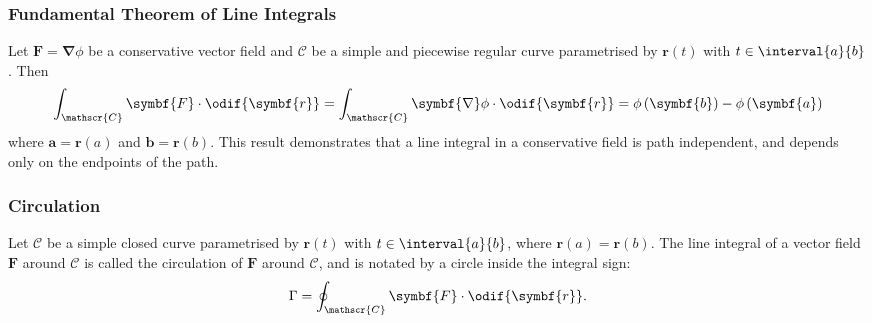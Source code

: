 \documentclass{article}
\begin{document}
\subsubsection{Fundamental Theorem of Line Integrals}
Let \(\symbf{F} = \symbf{\nabla} \phi\) be a conservative vector field
and \(\mathscr{C}\) be a simple and piecewise regular curve
parametrised by \(\symbf{r}\left( t \right)\) with \(t \in
\interval{a}{b}\). Then
\begin{equation*}
    \int_{\mathscr{C}} \symbf{F} \cdot \odif{\symbf{r}} = \int_{\mathscr{C}} \symbf{\nabla} \phi \cdot \odif{\symbf{r}} = \phi\left( \symbf{b} \right) - \phi\left( \symbf{a} \right)
\end{equation*}
where \(\symbf{a} = \symbf{r}\left( a \right)\) and \(\symbf{b} = \symbf{r}\left( b \right)\).
This result demonstrates that a line integral in a conservative field
is path independent, and depends only on the endpoints of the path.
\subsubsection{Circulation}
Let \(\mathscr{C}\) be a simple closed curve parametrised by
\(\symbf{r}\left( t \right)\) with \(t \in \interval{a}{b}\), where
\(\symbf{r}\left( a \right) = \symbf{r}\left( b \right)\). The line
integral of a vector field \(\symbf{F}\) around \(\mathscr{C}\) is
called the circulation of \(\symbf{F}\) around \(\mathscr{C}\), and is
notated by a circle inside the integral sign:
\begin{equation*}
    \Gamma = \oint_{\mathscr{C}} \symbf{F} \cdot \odif{\symbf{r}}.
\end{equation*}
\end{document}
